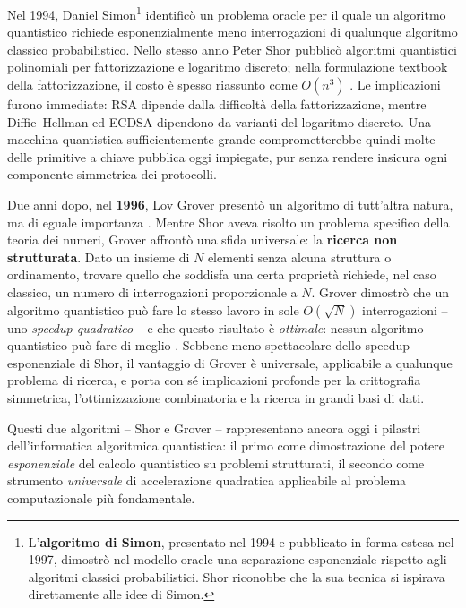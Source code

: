\begin{onehalfspace}
Nel 1994, Daniel Simon\footnote{L'\textbf{algoritmo di Simon}, presentato nel 1994 e pubblicato in forma estesa nel 1997, dimostrò nel modello oracle una separazione esponenziale rispetto agli algoritmi classici probabilistici. Shor riconobbe che la sua tecnica si ispirava direttamente alle idee di Simon.} identificò un problema oracle per il quale un algoritmo quantistico richiede esponenzialmente meno interrogazioni di qualunque algoritmo classico probabilistico. Nello stesso anno Peter Shor pubblicò algoritmi quantistici polinomiali per fattorizzazione e logaritmo discreto; nella formulazione textbook della fattorizzazione, il costo è spesso riassunto come $O(n^3)$ \cite{shor1994}. Le implicazioni furono immediate: RSA dipende dalla difficoltà della fattorizzazione, mentre Diffie--Hellman ed \ac{ECDSA} dipendono da varianti del logaritmo discreto. Una macchina quantistica sufficientemente grande comprometterebbe quindi molte delle primitive a chiave pubblica oggi impiegate, pur senza rendere insicura ogni componente simmetrica dei protocolli.

Due anni dopo, nel \textbf{1996}, Lov Grover presentò un algoritmo di tutt'altra natura, ma di eguale importanza \cite{grover1996}. Mentre Shor aveva risolto un problema specifico della teoria dei numeri, Grover affrontò una sfida universale: la \textbf{ricerca non strutturata}. Dato un insieme di $N$ elementi senza alcuna struttura o ordinamento, trovare quello che soddisfa una certa proprietà richiede, nel caso classico, un numero di interrogazioni proporzionale a $N$. Grover dimostrò che un algoritmo quantistico può fare lo stesso lavoro in sole $O(\sqrt{N})$ interrogazioni -- uno \textit{speedup quadratico} -- e che questo risultato è \textit{ottimale}: nessun algoritmo quantistico può fare di meglio \cite{zalka1999}. Sebbene meno spettacolare dello speedup esponenziale di Shor, il vantaggio di Grover è universale, applicabile a qualunque problema di ricerca, e porta con sé implicazioni profonde per la crittografia simmetrica, l'ottimizzazione combinatoria e la ricerca in grandi basi di dati.

Questi due algoritmi -- Shor e Grover -- rappresentano ancora oggi i pilastri dell'informatica algoritmica quantistica: il primo come dimostrazione del potere \textit{esponenziale} del calcolo quantistico su problemi strutturati, il secondo come strumento \textit{universale} di accelerazione quadratica applicabile al problema computazionale più fondamentale.


\end{onehalfspace}
